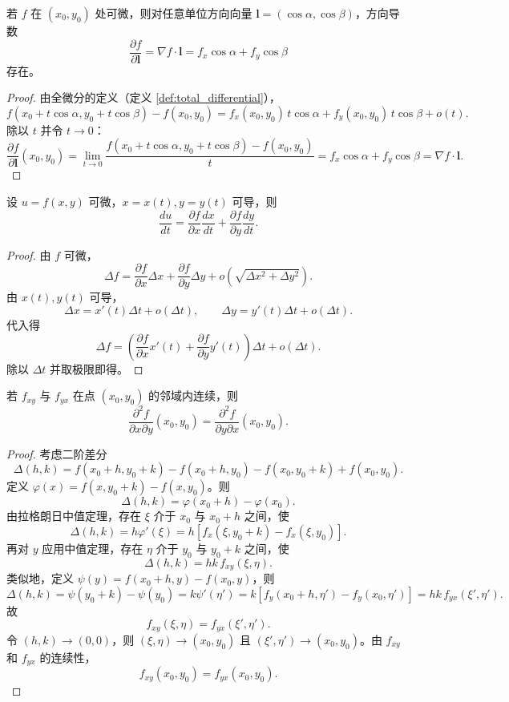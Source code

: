 \begin{lemma}[方向导数的存在性]\label{lem:directional_derivative}
若 $f$ 在 $(x_0, y_0)$ 处可微，则对任意单位方向向量 $\boldsymbol{l} = (\cos\alpha, \cos\beta)$，方向导数
\[\frac{\partial f}{\partial \boldsymbol{l}} = \nabla f \cdot \boldsymbol{l} = f_x \cos\alpha + f_y \cos\beta\]
存在。
\end{lemma}

\begin{proof}
由全微分的定义（定义 \ref{def:total_differential}），
\[
f(x_0 + t\cos\alpha, y_0 + t\cos\beta) - f(x_0, y_0) = f_x(x_0,y_0)\,t\cos\alpha + f_y(x_0,y_0)\,t\cos\beta + o(t).
\]
除以 $t$ 并令 $t \to 0$：
\[
\frac{\partial f}{\partial \boldsymbol{l}}(x_0, y_0) = \lim_{t \to 0} \frac{f(x_0 + t\cos\alpha, y_0 + t\cos\beta) - f(x_0, y_0)}{t} = f_x \cos\alpha + f_y \cos\beta = \nabla f \cdot \boldsymbol{l}.
\]
\end{proof}

\begin{theorem}[多元链式法则]\label{thm:multivariable_chain_rule}
设 $u = f(x, y)$ 可微，$x = x(t), y = y(t)$ 可导，则
\[\frac{du}{dt} = \frac{\partial f}{\partial x}\frac{dx}{dt} + \frac{\partial f}{\partial y}\frac{dy}{dt}.\]
\end{theorem}

\begin{proof}
由 $f$ 可微，
\[
\Delta f = \frac{\partial f}{\partial x}\Delta x + \frac{\partial f}{\partial y}\Delta y + o\!\left(\sqrt{\Delta x^2 + \Delta y^2}\right).
\]
由 $x(t), y(t)$ 可导，
\[
\Delta x = x'(t)\Delta t + o(\Delta t), \qquad \Delta y = y'(t)\Delta t + o(\Delta t).
\]
代入得
\[
\Delta f = \left( \frac{\partial f}{\partial x}x'(t) + \frac{\partial f}{\partial y}y'(t) \right)\Delta t + o(\Delta t).
\]
除以 $\Delta t$ 并取极限即得。
\end{proof}

\begin{theorem}\label{thm:clairaut}
若 $f_{xy}$ 与 $f_{yx}$ 在点 $(x_0, y_0)$ 的邻域内连续，则
\[\frac{\partial^2 f}{\partial x \partial y}(x_0, y_0) = \frac{\partial^2 f}{\partial y \partial x}(x_0, y_0).\]
\end{theorem}

\begin{proof}
考虑二阶差分
\[
\Delta(h,k) = f(x_0+h, y_0+k) - f(x_0+h, y_0) - f(x_0, y_0+k) + f(x_0, y_0).
\]
定义 $\varphi(x) = f(x, y_0+k) - f(x, y_0)$。则
\[
\Delta(h,k) = \varphi(x_0+h) - \varphi(x_0).
\]
由拉格朗日中值定理，存在 $\xi$ 介于 $x_0$ 与 $x_0+h$ 之间，使
\[
\Delta(h,k) = h\varphi'(\xi) = h[f_x(\xi, y_0+k) - f_x(\xi, y_0)].
\]
再对 $y$ 应用中值定理，存在 $\eta$ 介于 $y_0$ 与 $y_0+k$ 之间，使
\[
\Delta(h,k) = hk\, f_{xy}(\xi, \eta).
\]
类似地，定义 $\psi(y) = f(x_0+h, y) - f(x_0, y)$，则
\[
\Delta(h,k) = \psi(y_0+k) - \psi(y_0) = k\psi'(\eta') = k[f_y(x_0+h, \eta') - f_y(x_0, \eta')] = hk\, f_{yx}(\xi', \eta').
\]
故
\[
f_{xy}(\xi, \eta) = f_{yx}(\xi', \eta').
\]
令 $(h,k) \to (0,0)$，则 $(\xi,\eta) \to (x_0,y_0)$ 且 $(\xi',\eta') \to (x_0,y_0)$。由 $f_{xy}$ 和 $f_{yx}$ 的连续性，
\[
f_{xy}(x_0,y_0) = f_{yx}(x_0,y_0).
\]
\end{proof}

